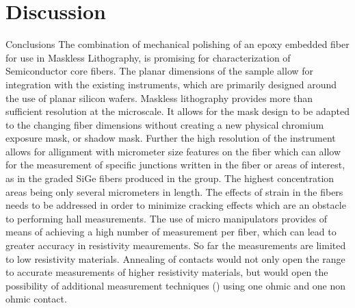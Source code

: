 \section{Discussion}
Conclusions
The combination of mechanical polishing of an epoxy embedded fiber for use in Maskless Lithography, is promising for characterization of Semiconductor core fibers. The planar dimensions of the sample allow for integration with the existing instruments, which are primarily designed around the use of planar silicon wafers.  Maskless lithography provides more than sufficient resolution at the microscale. It allows for the mask design to be adapted to the changing fiber dimensions without creating a new physical chromium exposure mask, or shadow mask. Further the high resolution of the instrument allows for allignment with micrometer size features on the fiber which can allow for the measurement of specific junctions written in the fiber or areas of interest, as in the graded SiGe fibers produced in the group. The highest concentration areas being only several micrometers in length. The effects of strain in the fibers needs to be addressed in order to minimize cracking effects which are an obstacle to performing hall measurements. The use of micro manipulators provides of means of achieving a high number of measurement per fiber, which can lead to greater accuracy in resistivity meaurements. So far the measurements are limited to low resistivity materials. Annealing of contacts would not only open the range to accurate measurements of higher resistivity materials, but would open the possibility of additional measurement techniques () using one ohmic and one non ohmic contact. 
